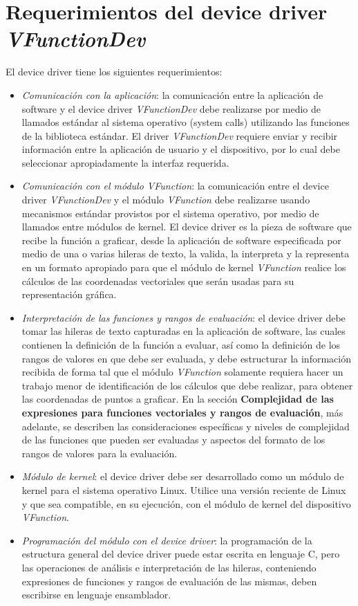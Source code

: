 \documentclass[12pt,letterpaper]{article}
\begin{document}
\section*{Requerimientos del device driver \textit{VFunctionDev}}
El device driver tiene los siguientes requerimientos:
\begin{itemize}

\item \textit{Comunicación con la aplicación}: la comunicación entre la aplicación de software y el device driver \textit{VFunctionDev} debe realizarse por medio de llamados estándar al sistema operativo (system calls) utilizando las funciones de la biblioteca estándar. El driver \textit{VFunctionDev} requiere enviar y recibir información entre la aplicación de usuario y el dispositivo, por lo cual debe seleccionar apropiadamente la interfaz requerida. 
\item \textit{Comunicación con el módulo VFunction}: la comunicación entre el device driver \textit{VFunctionDev} y el módulo \textit{VFunction} debe realizarse usando mecanismos estándar provistos por el sistema operativo, por medio de llamados entre módulos de kernel. 
El device driver es la pieza de software que recibe la función a graficar, desde la aplicación de software especificada por medio de una o varias hileras de texto, la valida, la interpreta y la representa en un formato apropiado para que el módulo de kernel \textit{VFunction} realice los cálculos de las coordenadas vectoriales que serán usadas para su representación gráfica. 
\item \textit{Interpretación de las funciones y rangos de evaluación}: el device driver debe tomar las hileras de texto capturadas en la aplicación de software, las cuales contienen la definición de la función a evaluar, así como la definición de los rangos de valores en que debe ser evaluada, y debe estructurar la información recibida de forma tal que el módulo \textit{VFunction} solamente requiera hacer un trabajo menor de identificación de los cálculos que debe realizar, para obtener las coordenadas de puntos a graficar. En la sección \textbf{Complejidad de las expresiones para funciones vectoriales y rangos de evaluación}, más adelante, se describen las consideraciones específicas y niveles de complejidad de las funciones que pueden ser evaluadas y aspectos del formato de los rangos de valores para la evaluación.
\item \textit{Módulo de kernel}: el device driver debe ser desarrollado como un módulo de kernel para el sistema operativo Linux. Utilice una versión reciente de Linux y que sea compatible, en su ejecución, con el módulo de kernel del dispositivo \textit{VFunction}.
\item \textit{Programación del módulo con el device driver}: la programación de la estructura general del device driver puede estar escrita en lenguaje C, pero las operaciones de análisis e interpretación de las hileras, conteniendo expresiones de funciones y rangos de evaluación de las mismas, deben escribirse en lenguaje ensamblador.
\end{itemize}
\end{document}
